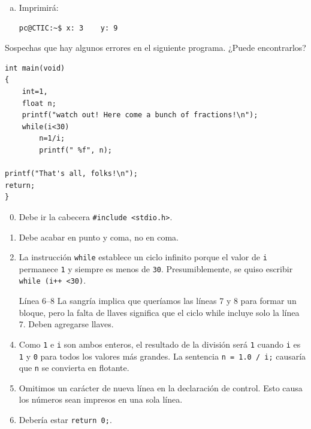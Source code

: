 \documentclass[spanish,addpoints,answers,a4paper]{exam}
\begin{document}
\begin{questions}
\begin{solution}
\begin{multicols}{2}
\begin{enumerate}[(a)]
\item Imprimirá:

\begin{verbatim}
pc@CTIC:~$ x: 3    y: 9
\end{verbatim}

\end{enumerate}
\end{multicols}

\end{solution}

\question Sospechas que hay algunos errores en el siguiente programa. ¿Puede encontrarlos?

\begin{verbatim}
int main(void)
{
	int=1,
	float n;
	printf("watch out! Here come a bunch of fractions!\n");
	while(i<30)
		n=1/i;
		printf(" %f", n);
		
printf("That's all, folks!\n");
return;
}
\end{verbatim}

\begin{solution}
\begin{enumerate}[label={Línea \arabic*:},leftmargin=1.2cm]\setcounter{enumi}{-1}
	\item Debe ir la cabecera \texttt{#include <stdio.h>}.\setcounter{enumi}{2}
	\item Debe acabar en punto y coma, no en coma.\setcounter{enumi}{5}
	\item La instrucción \texttt{while} establece un ciclo infinito porque el valor de \texttt{i} permanece \texttt{1}	y siempre es menos de \texttt{30}. Presumiblemente, se quiso escribir \texttt{while (i++ <30)}.
	\item[Línea 6--8] La sangría implica que queríamos las líneas 7 y 8 para formar un bloque, pero la falta de llaves significa que el ciclo while incluye solo la línea 7. Deben agregarse llaves.\setcounter{enumi}{6}
	\item Como \texttt{1} e \texttt{i} son ambos enteros, el resultado de la división será \texttt{1} cuando \texttt{i} es \texttt{1} y \texttt{0} para todos los valores más grandes. La sentencia \texttt{n = 1.0 / i;} causaría que \texttt{n} se convierta en flotante.
	\item Omitimos un carácter de nueva línea \texttt{\n} en la declaración de control. Esto causa los números sean impresos en una sola línea.\setcounter{enumi}{9}
	\item Debería estar \texttt{return 0;}.
\end{enumerate}


\end{solution}
\end{questions}
\end{document}
